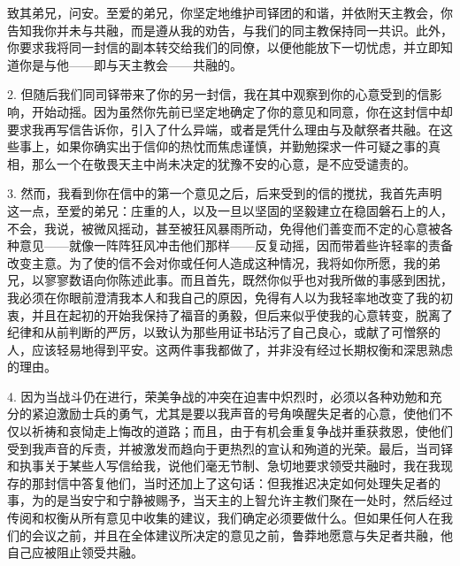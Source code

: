 \par

致其弟兄，问安。至爱的弟兄，你坚定地维护司铎团的和谐，并依附天主教会，你告知我你并未与共融，而是遵从我的劝告，与我们的同主教保持同一共识。此外，你要求我将同一封信的副本转交给我们的同僚，以便他能放下一切忧虑，并立即知道你是与他——即与天主教会——共融的。\par

2. 但随后我们同司铎带来了你的另一封信，我在其中观察到你的心意受到的信影响，开始动摇。因为虽然你先前已坚定地确定了你的意见和同意，你在这封信中却要求我再写信告诉你，引入了什么异端，或者是凭什么理由与及献祭者共融。在这些事上，如果你确实出于信仰的热忱而焦虑谨慎，并勤勉探求一件可疑之事的真相，那么一个在敬畏天主中尚未决定的犹豫不安的心意，是不应受谴责的。\par

3. 然而，我看到你在信中的第一个意见之后，后来受到的信的搅扰，我首先声明这一点，至爱的弟兄：庄重的人，以及一旦以坚固的坚毅建立在稳固磐石上的人，不会，我说，被微风摇动，甚至被狂风暴雨所动，免得他们善变而不定的心意被各种意见——就像一阵阵狂风冲击他们那样——反复动摇，因而带着些许轻率的责备改变主意。为了使的信不会对你或任何人造成这种情况，我将如你所愿，我的弟兄，以寥寥数语向你陈述此事。而且首先，既然你似乎也对我所做的事感到困扰，我必须在你眼前澄清我本人和我自己的原因，免得有人以为我轻率地改变了我的初衷，并且在起初的开始我保持了福音的勇毅，但后来似乎使我的心意转变，脱离了纪律和从前判断的严厉，以致认为那些用证书玷污了自己良心，或献了可憎祭的人，应该轻易地得到平安。这两件事我都做了，并非没有经过长期权衡和深思熟虑的理由。\par

4. 因为当战斗仍在进行，荣美争战的冲突在迫害中炽烈时，必须以各种劝勉和充分的紧迫激励士兵的勇气，尤其是要以我声音的号角唤醒失足者的心意，使他们不仅以祈祷和哀恸走上悔改的道路；而且，由于有机会重复争战并重获救恩，使他们受到我声音的斥责，并被激发而趋向于更热烈的宣认和殉道的光荣。最后，当司铎和执事关于某些人写信给我，说他们毫无节制、急切地要求领受共融时，我在我现存的那封信中答复他们，当时还加上了这句话：但我推迟决定如何处理失足者的事，为的是当安宁和宁静被赐予，当天主的上智允许主教们聚在一处时，然后经过传阅和权衡从所有意见中收集的建议，我们确定必须要做什么。但如果任何人在我们的会议之前，并且在全体建议所决定的意见之前，鲁莽地愿意与失足者共融，他自己应被阻止领受共融。\par

